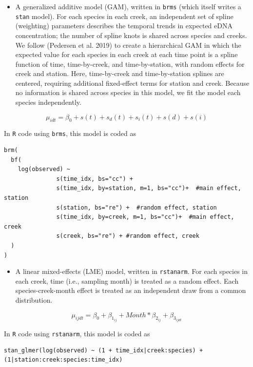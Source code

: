 \documentclass[
]{article}
\providecommand{\tightlist}{%
  \setlength{\itemsep}{0pt}\setlength{\parskip}{0pt}}
\begin{document}
\begin{itemize}
\tightlist
\item
  A generalized additive model (GAM), written in \texttt{brms} (which
  itself writes a \texttt{stan} model). For each species in each creek,
  an independent set of spline (weighting) parameters describes the
  temporal trends in expected eDNA concentration; the number of spline
  knots is shared across species and creeks. We follow (Pedersen et al.
  2019) to create a hierarchical GAM in which the expected value for
  each species in each creek at each time point is a spline function of
  time, time-by-creek, and time-by-station, with random effects for
  creek and station. Here, time-by-creek and time-by-station splines are
  centered, requiring additional fixed-effect terms for station and
  creek. Because no information is shared across species in this model,
  we fit the model each species independently.
\end{itemize}

\[\mu_{idt} = \beta_0 + s(t) + s_{d}(t) + s_{i}(t) + s(d) + s(i) \]

In \texttt{R} code using \texttt{brms}, this model is coded as

\begin{verbatim}
brm(
  bf(
    log(observed) ~ 
               s(time_idx, bs="cc") + 
               s(time_idx, by=station, m=1, bs="cc")+  #main effect, station
               s(station, bs="re") +  #random effect, station
               s(time_idx, by=creek, m=1, bs="cc")+  #main effect, creek
               s(creek, bs="re") + #random effect, creek
  )
)
\end{verbatim}

\begin{itemize}
\tightlist
\item
  A linear mixed-effects (LME) model, written in \texttt{rstanarm}. For
  each species in each creek, time (i.e., sampling month) is treated as
  a random effect. Each species-creek-month effect is treated as an
  independent draw from a common distribution.
\end{itemize}

\[\mu_{ijdt} = \beta_0 + \beta_{1_{ij}} + Month*\beta_{2_{ij}} + \beta_{3_{ijdt}}\]

In \texttt{R} code using \texttt{rstanarm}, this model is coded as

\begin{verbatim}
stan_glmer(log(observed) ~ (1 + time_idx|creek:species) + (1|station:creek:species:time_idx)
\end{verbatim}
\end{document}
